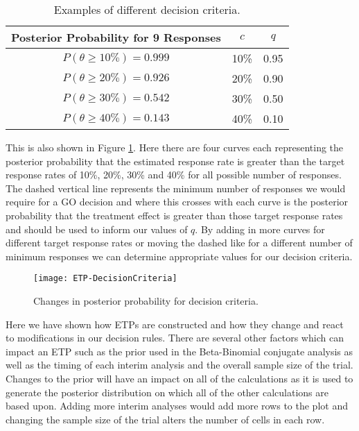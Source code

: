 \begin{table}[h!]
	\centering
	\caption{Examples of different decision criteria.}
	\label{tab_etp:DecisionCriteria}
	\begin{tabular}{c|c|c}
		\hline
		\textbf{Posterior Probability for 9 Responses}     & \textbf{$c$}  & \textbf{$q$}              \\ \hline
		$P(\theta  \geq 10\%) =  0.999$  & 10\% 	& 0.95                            					\\
		$P(\theta  \geq 20\%) =  0.926$  & 20\%     & 0.90                         \\
		$P(\theta  \geq 30\%) =  0.542$  & 30\%     & 0.50                      \\
		$P(\theta  \geq 40\%) =  0.143$  & 40\%     & 0.10                    \\ \hline
	\end{tabular}
\end{table}

This is also shown in Figure \ref{fig_etp:DecisionCriteria}.  Here there are four curves each representing the posterior probability that the estimated response rate is greater than the target response rates of 10\%, 20\%, 30\% and 40\% for all possible number of responses. The dashed vertical line represents the minimum number of responses we would require for a GO decision and where this crosses with each curve is the posterior probability that the treatment effect is greater than those target response rates and should be used to inform our values of $q$. By adding in more curves for different target response rates or moving the dashed like for a different number of minimum responses we can determine appropriate values for our decision criteria. 

\begin{figure}[h!]
	\centering
	\caption{Changes in posterior probability for decision criteria.}
	\label{fig_etp:DecisionCriteria}
	\texttt{[image: ETP-DecisionCriteria]}
\end{figure}

Here we have shown how ETPs are constructed and how they change and react to modifications in our decision rules. There are several other factors which can impact an ETP such as the prior used in the Beta-Binomial conjugate analysis as well as the timing of each interim analysis and the overall sample size of the trial. Changes to the prior will have an impact on all of the calculations as it is used to generate the posterior distribution on which all of the other calculations are based upon. Adding more interim analyses would add more rows to the plot and changing the sample size of the trial alters the number of cells in each row. 

